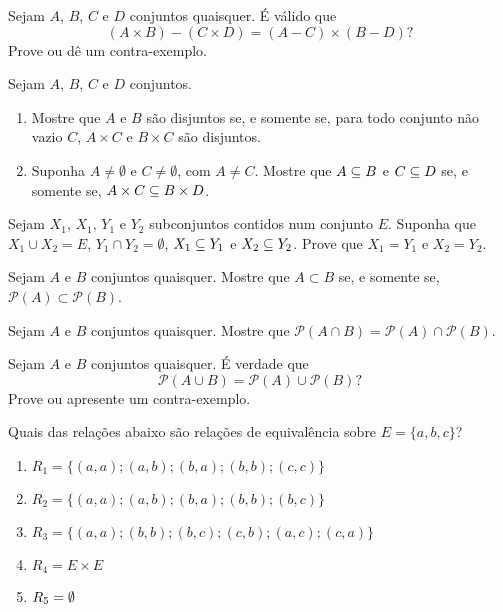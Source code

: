 \documentclass[12pt]{exam}
\begin{document}
    \vspace{.3cm}

    \questao{} Sejam $A$, $B$, $C$ e $D$ conjuntos quaisquer. É válido que
    \[
        (A \times B) - (C \times D) = (A - C) \times (B - D)?
    \]
    Prove ou dê um contra-exemplo.

    \vspace{.3cm}

    \questao{} Sejam $A$, $B$, $C$ e $D$ conjuntos.
    \begin{enumerate}[label={\alph*})]
        \item Mostre que $A$ e $B$ s\~ao disjuntos se, e somente se, para todo conjunto n\~ao vazio $C$, $A \times C$ e $B \times C$ s\~ao disjuntos.

        \item Suponha $A \ne \emptyset$ e $C \ne \emptyset$, com $A \ne C$. Mostre que $A \subseteq B$ e $C \subseteq D$ se, e somente se, $A \times C \subseteq B \times D$.
    \end{enumerate}

    \vspace{.3cm}

    \questao{} Sejam $X_1$, $X_1$, $Y_1$ e $Y_2$ subconjuntos contidos num conjunto $E$. Suponha que $X_1 \cup X_2 = E$, $Y_1 \cap Y_2 = \emptyset$, $X_1 \subseteq Y_1$ e $X_2 \subseteq Y_2$. Prove que $X_1 = Y_1$ e $X_2 = Y_2$.

    \vspace{.3cm}

    \questao{} Sejam $A$ e $B$ conjuntos quaisquer. Mostre que $A \subset B$ se, e somente se, $\mathcal{P}(A) \subset \mathcal{P}(B)$.

    \vspace{.3cm}

    \questao{} Sejam $A$ e $B$ conjuntos quaisquer. Mostre que $\mathcal{P}(A \cap B) = \mathcal{P}(A) \cap \mathcal{P}(B)$.

    \vspace{.3cm}

    \questao{} Sejam $A$ e $B$ conjuntos quaisquer. É verdade que
    \[
       \mathcal{P}(A \cup B) = \mathcal{P}(A) \cup \mathcal{P}(B)?
    \]
    Prove ou apresente um contra-exemplo.

    \vspace{.3cm}

    \questao{} Quais das rela{\c c}{\~o}es abaixo s{\~a}o rela{\c c}{\~o}es de equival{\^e}ncia sobre $E = \{a,b,c\}$?
    \begin{enumerate}[label={\alph*})]
        \item $R_1 = \{(a,a);(a,b);(b,a);(b,b);(c,c)\}$

        \item $R_2 = \{(a,a);(a,b);(b,a);(b,b);(b,c)\}$

        \item $R_3 = \{(a,a);(b,b);(b,c);(c,b);(a,c);(c,a)\}$

        \item $R_4 = E \times E$

        \item $R_5 = \emptyset$
    \end{enumerate}
\end{document}
